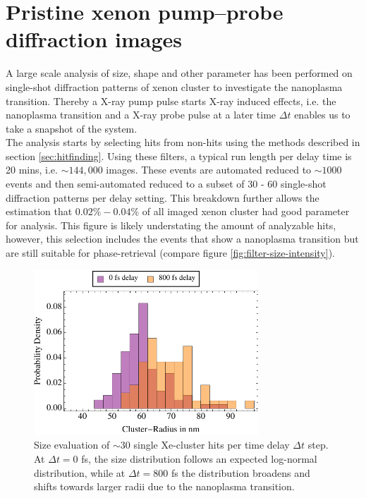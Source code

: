 \section{Pristine xenon pump--probe diffraction images}\label{sec:xenon-data}
A large scale analysis of size, shape and other parameter has been performed on single-shot diffraction patterns of xenon cluster to investigate the nanoplasma transition. Thereby a X-ray pump pulse starts X-ray induced effects, i.e. the nanoplasma transition and a X-ray probe pulse at a later time $\Delta t$ enables us to take a snapshot of the system.\\
The analysis starts by selecting hits from non-hits using the methods described in section \ref{sec:hitfinding}. Using these filters, a typical run length per delay time is 20 mins, i.e. $\sim 144,000$ images. These events are automated reduced to $\sim 1000$ events and then semi-automated reduced to a subset of 30 - 60 single-shot diffraction patterns per delay setting. This breakdown further allows the estimation that $0.02\% - 0.04\%$ of all imaged xenon cluster had good parameter for analysis. This figure is likely understating the amount of analyzable hits, however, this selection includes the events that show a nanoplasma transition but are still suitable for phase-retrieval (compare figure \ref{fig:filter-size-intensity}).\\
\begin{figure}
	\centering
		\includegraphics[width=0.75\textwidth]{images/size-distributions.pdf}
	\caption{Size evaluation of $\sim 30$ single Xe-cluster hits per time delay $\Delta t$ step. At $\Delta t=0$ fs, the size distribution follows an expected log-normal distribution, while at $\Delta t=800$ fs the distribution broadens and shifts towards larger radii due to the nanoplasma transition.}
	\label{fig:size-distributions}
\end{figure}
